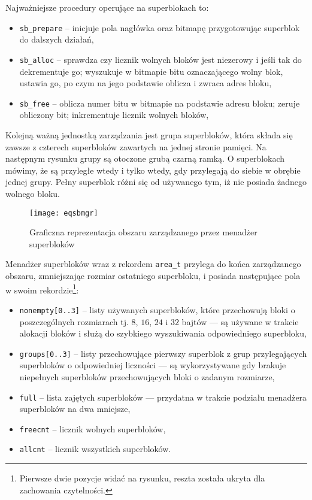 \documentclass[12pt,a4paper,titlepage,twoside]{mwart}
\begin{document}
Najważniejsze procedury operujące na superblokach to:
\begin{itemize}
\item \verb+sb_prepare+ -- inicjuje pola nagłówka oraz bitmapę przygotowując
superblok do dalszych działań,
\item \verb+sb_alloc+ -- sprawdza czy licznik wolnych bloków jest niezerowy i
jeśli tak do dekrementuje go; wyszukuje w bitmapie bitu oznaczającego wolny
blok, ustawia go, po czym na jego podstawie oblicza i zwraca adres bloku,
\item \verb+sb_free+ -- oblicza numer bitu w bitmapie na podstawie adresu
bloku; zeruje obliczony bit; inkrementuje licznik wolnych bloków,
\end{itemize}

Kolejną ważną jednostką zarządzania jest grupa superbloków, która składa się
zawsze z czterech superbloków zawartych na jednej stronie pamięci. Na następnym
rysunku grupy są otoczone grubą czarną ramką. O superblokach mówimy, że są
przyległe wtedy i tylko wtedy, gdy przylegają do siebie w obrębie jednej grupy.
Pełny superblok różni się od używanego tym, iż nie posiada żadnego wolnego bloku.

\begin{figure}[ht]
\centering
\texttt{[image: eqsbmgr]}
\caption{Graficzna reprezentacja obszaru zarządzanego przez menadżer superbloków}
\end{figure}

Menadżer superbloków wraz z rekordem \texttt{area\_t} przylega do końca
zarządzanego obszaru, zmniejszając rozmiar ostatniego superbloku, i posiada
następujące pola w swoim rekordzie\footnote{Pierwsze dwie pozycje widać na
rysunku, reszta została ukryta dla zachowania czytelności.}:
\begin{itemize}
\item \verb+nonempty[0..3]+ -- listy używanych superbloków, które przechowują
bloki o poszczególnych rozmiarach tj. $8$, $16$, $24$ i $32$ bajtów --- są
używane w trakcie alokacji bloków i służą do szybkiego wyszukiwania
odpowiedniego superbloku,
\item \verb+groups[0..3]+ -- listy przechowujące pierwszy superblok z grup
przylegających superbloków o odpowiedniej liczności --- są wykorzystywane gdy
brakuje niepełnych superbloków przechowujących bloki o zadanym rozmiarze,
\item \verb+full+ -- lista zajętych superbloków --- przydatna w trakcie
podziału menadżera superbloków na dwa mniejsze,
\item \verb+freecnt+ -- licznik wolnych superbloków,
\item \verb+allcnt+ -- licznik wszystkich superbloków.
\end{itemize}
\end{document}
